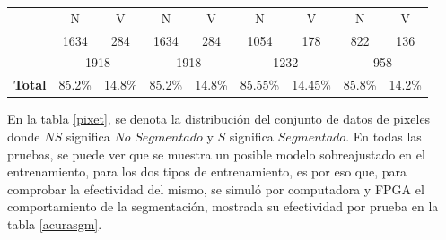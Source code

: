 \documentclass[twoside,spanish,ESP,MSc]{plantillaLabUPV}
\theoremstyle{definition}
\begin{document}
\begin{table}[!tbh]
\begin{tabular}{|c|c|c|c|c|c|c|c|c|}
		& {\color[HTML]{F56B00} N} & {\color[HTML]{009901} V} & {\color[HTML]{F56B00} N} & {\color[HTML]{009901} V} & {\color[HTML]{F56B00} N} & {\color[HTML]{009901} V} & {\color[HTML]{F56B00} N} & {\color[HTML]{009901} V} \\ \cline{2-9} 
		& 1634                     & 284                      & 1634                     & 284                      & 1054                        & 178                        & 822                        & 136                        \\
		\cline{2-9} 
		& \multicolumn{2}{c|}{1918}                           & \multicolumn{2}{c|}{1918}                           & \multicolumn{2}{c|}{1232}                           & \multicolumn{2}{c|}{958}                           \\ \cline{2-9} 
		\multirow{-4}{*}{\textbf{Total}} & 85.2\%                   & 14.8\%                   & 85.2\%                   & 14.8\%                   & 85.55\%                      & 14.45\%                      & 85.8\%                      & 14.2\%                      \\ \hline

	\end{tabular}
\end{table}


En la tabla \ref{pixet}, se denota la distribución del conjunto de datos de pixeles donde $NS$ significa $No$ $Segmentado$  y $S$ significa $Segmentado$. En todas las pruebas, se puede ver que se muestra un posible modelo sobreajustado en el entrenamiento, para los dos tipos de entrenamiento, es por eso que, para comprobar la efectividad del mismo, se simuló por computadora y FPGA el comportamiento de la segmentación, mostrada su efectividad por prueba en la tabla \ref{acurasgm}.
\end{document}

